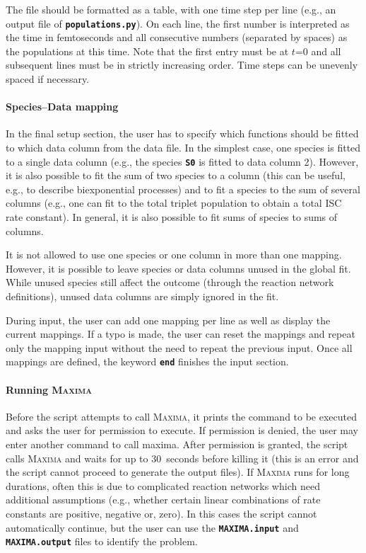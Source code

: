 \documentclass[a4paper,10pt,DIV=15,openany,twoside=false]{scrbook}
\newcommand{\ttt}[1]{\textbf{\texttt{#1}}}
\begin{document}
The file should be formatted as a table, with one time step per line (e.g., an output file of \ttt{populations.py}). 
On each line, the first number is interpreted as the time in femtoseconds and all consecutive numbers (separated by spaces) as the populations at this time.
Note that the first entry must be at $t$=0 and all subsequent lines must be in strictly increasing order.
Time steps can be unevenly spaced if necessary.

\paragraph{Species--Data mapping}

In the final setup section, the user has to specify which functions should be fitted to which data column from the data file.
In the simplest case, one species is fitted to a single data column (e.g., the species \ttt{S0} is fitted to data column 2).
However, it is also possible to fit the sum of two species to a column (this can be useful, e.g., to describe biexponential processes) and to fit a species to the sum of several columns (e.g., one can fit to the total triplet population to obtain a total ISC rate constant).
In general, it is also possible to fit sums of species to sums of columns.

It is not allowed to use one species or one column in more than one mapping.
However, it is possible to leave species or data columns unused in the global fit. 
While unused species still affect the outcome (through the reaction network definitions), unused data columns are simply ignored in the fit.

During input, the user can add one mapping per line as well as display the current mappings.
If a typo is made, the user can reset the mappings and repeat only the mapping input without the need to repeat the previous input.
Once all mappings are defined, the keyword \ttt{end} finishes the input section.

\paragraph{Running \textsc{Maxima}}

Before the script attempts to call \textsc{Maxima}, it prints the command to be executed and asks the user for permission to execute.
If permission is denied, the user may enter another command to call maxima.
After permission is granted, the script calls \textsc{Maxima} and waits for up to 30~seconds before killing it (this is an error and the script cannot proceed to generate the output files).
If \textsc{Maxima} runs for long durations, often this is due to complicated reaction networks which need additional assumptions (e.g., whether certain linear combinations of rate constants are positive, negative or, zero).
In this cases the script cannot automatically continue, but the user can use the \ttt{MAXIMA.input} and \ttt{MAXIMA.output} files to identify the problem.
\end{document}
